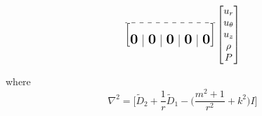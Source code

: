 \documentclass{article}
\newcommand{\bigzero}{\mbox{\normalfont\Large\bfseries 0}}
\newcommand{\rvline}{\hspace*{-\arraycolsep}\vline\hspace*{-\arraycolsep}}
\begin{document}
\begin{align}
\begin{split}
\begin{bmatrix}
\hdashline\\
  \bigzero & \rvline & \bigzero &\rvline & \bigzero & \rvline & \bigzero & \rvline & \bigzero\\
\end{bmatrix}
\begin{bmatrix}
 u_{r}\\
 u_{\theta}\\
 u_{z}\\
 \rho\\
 P\\
 \end{bmatrix}
 \end{split}
\end{align}

where
\begin{equation}
 \nabla^{2} = \bigg[\tilde{D}_{2} + \frac{1}{r}\tilde{D}_{1} - \bigg( \frac{m^{2} + 1}{r^{2}} + k^{2}\bigg)I\bigg]
\end{equation}





 \if@openright\cleardoublepage\else\clearpage\fi
 \cleardoublepage
 \pagestyle{empty}
\end{document}
